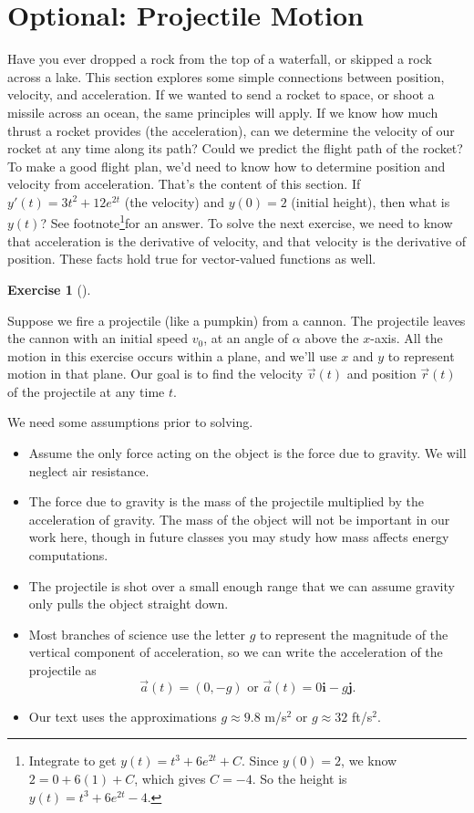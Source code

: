 \documentclass[10pt,]{book}
\theoremstyle{plain}
\theoremstyle{definition}
\theoremstyle{definition}
\theoremstyle{definition}
\theoremstyle{definition}
\newtheorem{exploration}[project]{Exercise}
\theoremstyle{definition}
\numberwithin{equation}{section}
\begin{document}
\section[{Optional: Projectile Motion}]{Optional: Projectile Motion}\label{section-24}
Have you ever dropped a rock from the top of a waterfall, or skipped a rock across a lake. This section explores some simple connections between position, velocity, and acceleration. If we wanted to send a rocket to space, or shoot a missile across an ocean, the same principles will apply. If we know how much thrust a rocket provides (the acceleration), can we determine the velocity of our rocket at any time along its path? Could we predict the flight path of the rocket? To make a good flight plan, we'd need to know how to determine position and velocity from acceleration. That's the content of this section.%
If \(y'(t) = 3t^2+12e^{2t}\) (the velocity) and \(y(0)=2\) (initial height), then what is \(y(t)\)? See footnote\footnote{Integrate to get \(y(t) = t^3+6e^{2t}+C\). Since \(y(0)=2\), we know \(2=0+6(1)+C\), which gives \(C=-4\). So the height is \(y(t) = t^3+6e^{2t}-4\).\label{fn-6}}for an answer.%
To solve the next exercise, we need to know that acceleration is the derivative of velocity, and that velocity is the derivative of position. These facts hold true for vector-valued functions as well.%
\begin{exploration}[]\label{exploration-160}
\end{exploration}
Suppose we fire a projectile (like a pumpkin) from a cannon. The projectile leaves the cannon with an initial speed \(v_0\), at an angle of \(\alpha\) above the \(x\)-axis. All the motion in this exercise occurs within a plane, and we'll use \(x\) and \(y\) to represent motion in that plane. Our goal is to find the velocity \(\vec v(t)\) and position \(\vec r(t)\) of the projectile at any time \(t\).%
\par
We need some assumptions prior to solving. \leavevmode%
\begin{itemize}[label=\textbullet]
\item{}Assume the only force acting on the object is the force due to gravity. We will neglect air resistance.%
\item{}The force due to gravity is the mass of the projectile multiplied by the acceleration of gravity. The mass of the object will not be important in our work here, though in future classes you may study how mass affects energy computations.%
\item{}The projectile is shot over a small enough range that we can assume gravity only pulls the object straight down.%
\item{}Most branches of science use the letter \(g\) to represent the magnitude of the vertical component of acceleration, so we can write the acceleration of the projectile as%
\begin{equation*}
\vec a(t) = (0,-g)   \text{ or }   \vec a(t)= 0\textbf{i}-g\textbf{j}.
\end{equation*}
%
\item{}Our text uses the approximations \(g\approx 9.8\) m/s\(^2\) or \(g\approx32\) ft/s\(^2\).%
\end{itemize}
\end{document}
